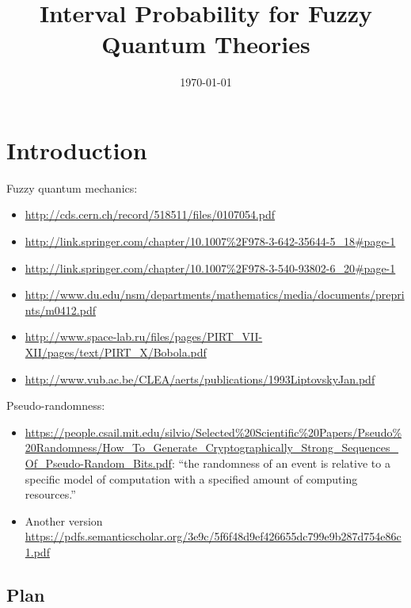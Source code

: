 \documentclass{article}
\theoremstyle{remark}
\begin{document}
\title{Interval Probability for Fuzzy Quantum Theories}
\author{}
\date{\today}
\maketitle

\section{Introduction}
  
Fuzzy quantum mechanics:
\begin{itemize}
\item \url{http://cds.cern.ch/record/518511/files/0107054.pdf}
\item \url{http://link.springer.com/chapter/10.1007%2F978-3-642-35644-5_18#page-1}
\item \url{http://link.springer.com/chapter/10.1007%2F978-3-540-93802-6_20#page-1}
\item \url{http://www.du.edu/nsm/departments/mathematics/media/documents/preprints/m0412.pdf}
\item \url{http://www.space-lab.ru/files/pages/PIRT_VII-XII/pages/text/PIRT_X/Bobola.pdf}
\item \url{http://www.vub.ac.be/CLEA/aerts/publications/1993LiptovskyJan.pdf}
\end{itemize}

\noindent Pseudo-randomness:
\begin{itemize}
\item
  \url{https://people.csail.mit.edu/silvio/Selected%20Scientific%20Papers/Pseudo%20Randomness/How_To_Generate_Cryptographically_Strong_Sequences_Of_Pseudo-Random_Bits.pdf}:
  ``the randomness of an event is relative to a specific model of
  computation with a specified amount of computing resources.''
\item Another version \url{https://pdfs.semanticscholar.org/3e9c/5f6f48d9ef426655dc799e9b287d754e86c1.pdf}
\end{itemize}

\subsection{Plan}
\end{document}
